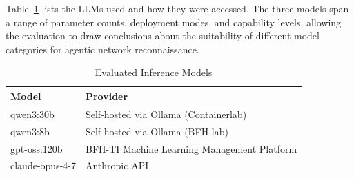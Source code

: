 Table~\ref{tab:used-inference-models} lists the \glspl{LLM} used and how they were accessed.
The three models span a range of parameter counts, deployment modes, and capability levels,
allowing the evaluation to draw conclusions about the suitability of different model categories for agentic network reconnaissance.

\begin{table}[h]
    \centering
    \begin{tabularx}{\linewidth}{lX}
        \hline
        \textbf{Model} & \textbf{Provider} \\
        \hline
        qwen3:30b & Self-hosted via \gls{Ollama} (Containerlab) \\
        qwen3:8b & Self-hosted via \gls{Ollama} (BFH lab) \\
        gpt-oss:120b & BFH-TI Machine Learning Management Platform \\
        claude-opus-4-7 & \gls{Anthropic} \gls{API} \\
        \hline
    \end{tabularx}
    \caption{Evaluated Inference Models}
    \label{tab:used-inference-models}
\end{table}

